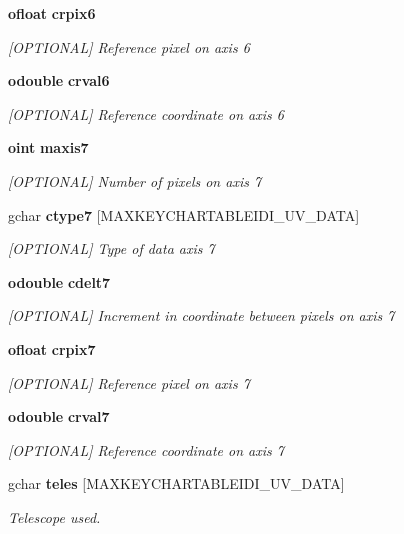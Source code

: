 \begin{CompactItemize}
{\bf ofloat} {\bf crpix6}
\begin{CompactList}\small\item\em [OPTIONAL] Reference pixel on axis 6 \item\end{CompactList}\item 
{\bf odouble} {\bf crval6}
\begin{CompactList}\small\item\em [OPTIONAL] Reference coordinate on axis 6 \item\end{CompactList}\item 
{\bf oint} {\bf maxis7}
\begin{CompactList}\small\item\em [OPTIONAL] Number of pixels on axis 7 \item\end{CompactList}\item 
gchar {\bf ctype7} [MAXKEYCHARTABLEIDI\_\-UV\_\-DATA]
\begin{CompactList}\small\item\em [OPTIONAL] Type of data axis 7 \item\end{CompactList}\item 
{\bf odouble} {\bf cdelt7}
\begin{CompactList}\small\item\em [OPTIONAL] Increment in coordinate between pixels on axis 7 \item\end{CompactList}\item 
{\bf ofloat} {\bf crpix7}
\begin{CompactList}\small\item\em [OPTIONAL] Reference pixel on axis 7 \item\end{CompactList}\item 
{\bf odouble} {\bf crval7}
\begin{CompactList}\small\item\em [OPTIONAL] Reference coordinate on axis 7 \item\end{CompactList}\item 
gchar {\bf teles} [MAXKEYCHARTABLEIDI\_\-UV\_\-DATA]
\begin{CompactList}\small\item\em Telescope used. \item\end{CompactList}\item 

\end{CompactItemize}
